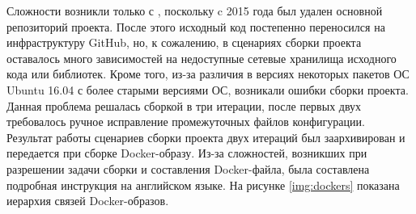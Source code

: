 Сложности возникли только с \toolchain{}, поскольку c 2015 года был удален основной репозиторий проекта. После этого исходный код постепенно переносился на инфраструктуру GitHub, но, к сожалению, в сценариях сборки проекта оставалось много зависимостей на недоступные сетевые хранилища исходного кода или библиотек. Кроме того, из-за различия в версиях некоторых пакетов ОС Ubuntu 16.04 с более старыми версиями ОС, возникали ошибки сборки проекта. Данная проблема решалась сборкой в три итерации, после первых двух требовалось ручное исправление промежуточных файлов конфигурации. Результат работы сценариев сборки проекта двух итераций был заархивирован и передается при сборке Docker-образу. Из-за сложностей, возникших при разрешении задачи сборки \toolchain{} и составления Docker-файла, была составлена подробная инструкция на английском языке. На рисунке \ref{img:dockers} показана иерархия связей Docker-образов.

